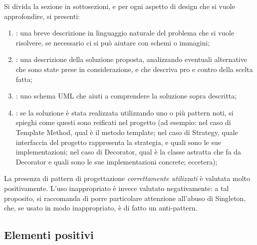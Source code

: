 \documentclass[a4paper,12pt]{report}
\begin{document}
	Si divida la sezione in sottosezioni, e per ogni aspetto di design che si vuole approfondire, si presenti:
	\begin{enumerate}
		\item: una breve descrizione in linguaggio naturale del problema che si vuole risolvere, se necessario ci si può aiutare con schemi o immagini;
		\item: una descrizione della soluzione proposta, analizzando eventuali alternative che sono state prese in considerazione, e che descriva pro e contro della scelta fatta;
		\item: uno schema UML che aiuti a comprendere la soluzione sopra descritta;
		\item: se la soluzione è stata realizzata utilizzando uno o più pattern noti, si spieghi come questi sono reificati nel progetto
		(ad esempio: nel caso di Template Method, qual è il metodo template;
		nel caso di Strategy, quale interfaccia del progetto rappresenta la strategia, e quali sono le sue implementazioni;
		nel caso di Decorator, qual è la classe astratta che fa da Decorator e quali sono le sue implementazioni concrete; eccetera);
	\end{enumerate}
	La presenza di pattern di progettazione \emph{correttamente utilizzati} è valutata molto positivamente.
	L'uso inappropriato è invece valutato negativamente: a tal proposito, si raccomanda di porre particolare attenzione all'abuso di Singleton, che, se usato in modo inappropriato, è di fatto un anti-pattern.
	
	\subsection*{Elementi positivi}
	
\end{document}
